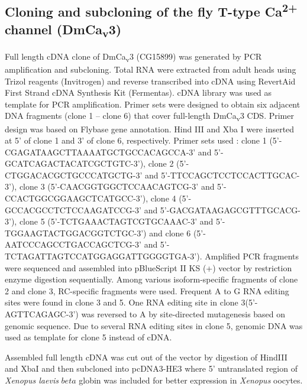 \subsection*{Cloning and subcloning of the fly T-type Ca\textsuperscript{2+} channel (DmCa\textsubscript{v}3)}

Full length cDNA clone of DmCa\textsubscript{v}3 (CG15899) was generated by PCR amplification and subcloning.
Total RNA were extracted from adult heads using Trizol reagents (Invitrogen) and reverse transcribed into cDNA using RevertAid First Strand cDNA Synthesis Kit (Fermentas).
cDNA library was used as template for PCR amplification.
Primer sets were designed to obtain six adjacent DNA fragments (clone 1 -- clone 6) that cover full-length DmCa\textsubscript{v}3 CDS.
Primer design was based on Flybase gene annotation.
Hind III and Xba I were inserted at 5' of clone 1 and 3' of clone 6, respectively.
Primer sets used : clone 1 (5'-CGAGATAAGCTTAAAATGCTGCCACAGCCA-3' and 5'-GCATCAGACTACATCGCTGTC-3'), clone 2 (5'-CTGGACACGCTGCCCATGCTG-3' and 5'-TTCCAGCTCCTCCACTTGCAC-3'), clone 3 (5'-CAACGGTGGCTCCAACAGTCG-3' and 5'-CCACTGGCGGAAGCTCATGCC-3'), clone 4 (5'-GCCACGCCTCTCCAAGATCCG-3' and 5'-GACGATAAGAGCGTTTGCACG-3'), clone 5 (5'-TCTGAAACTAGTCGTGCAAAC-3' and 5'-TGGAAGTACTGGACGGTCTGC-3') and clone 6 (5'-AATCCCAGCCTGACCAGCTCG-3' and 5'-TCTAGATTAGTCCATGGAGGATTGGGGTGA-3').
Amplified PCR fragments were sequenced and assembled into pBlueScript II KS (+) vector by restriction enzyme digestion sequentially.
Among various isoform-specific fragments of clone 2 and clone 3, RC-specific fragments were used.
Frequent A to G RNA editing sites were found in clone 3 and 5.
One RNA editing site in clone 3(5'-AGTTCAGAGC-3') was reversed to A by site-directed mutagenesis based on genomic sequence.
Due to several RNA editing sites in clone 5, genomic DNA was used as template for clone 5 instead of cDNA.

Assembled full length cDNA was cut out of the vector by digestion of HindIII and XbaI and then subcloned into pcDNA3-HE3 where 5' untranslated region of \emph{Xenopus laevis} $beta$ globin was included for better expression in \emph{Xenopus} oocytes.
    